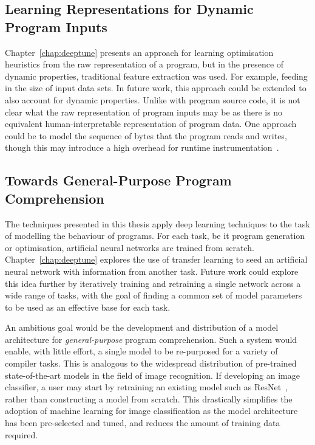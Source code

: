 \subsection{Learning Representations for Dynamic Program Inputs}

Chapter~\ref{chap:deeptune} presents an approach for learning optimisation heuristics from the raw representation of a program, but in the presence of dynamic properties, traditional feature extraction was used. For example, feeding in the size of input data sets. In future work, this approach could be extended to also account for dynamic properties. Unlike with program source code, it is not clear what the raw representation of program inputs may be as there is no equivalent human-interpretable representation of program data. One approach could be to model the sequence of bytes that the program reads and writes, though this may introduce a high overhead for runtime instrumentation~\cite{Gad2014}.


\subsection{Towards General-Purpose Program Comprehension}

The techniques presented in this thesis apply deep learning techniques to the task of modelling the behaviour of programs. For each task, be it program generation or optimisation, artificial neural networks are trained from scratch. Chapter~\ref{chap:deeptune} explores the use of transfer learning to seed an artificial neural network with information from another task. Future work could explore this idea further by iteratively training and retraining a single network across a wide range of tasks, with the goal of finding a common set of model parameters to be used as an effective base for each task.

An ambitious goal would be the development and distribution of a model architecture for \emph{general-purpose} program comprehension. Such a system would enable, with little effort, a single model to be re-purposed for a variety of compiler tasks. This is analogous to the widespread distribution of pre-trained state-of-the-art models in the field of image recognition. If developing an image classifier, a user may start by retraining an existing model such as ResNet~\cite{He2016}, rather than constructing a model from scratch. This drastically simplifies the adoption of machine learning for image classification as the model architecture has been pre-selected and tuned, and reduces the amount of training data required.

